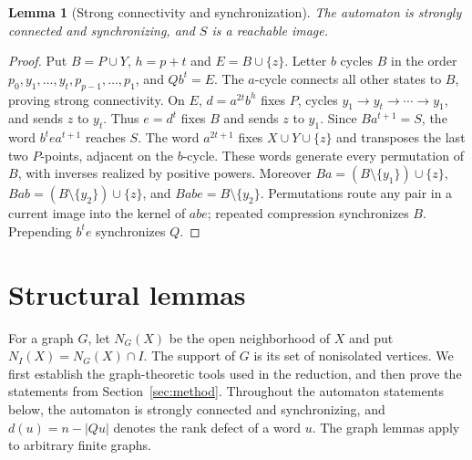 \documentclass[11pt]{article}
\newtheorem{lemma}[theorem]{Lemma}
\theoremstyle{definition}
\theoremstyle{plain}
\begin{document}
\begin{lemma}[Strong connectivity and synchronization]\label{lem:binary-structure}
The automaton is strongly connected and synchronizing, and $S$ is a
reachable image.
\end{lemma}
\begin{proof}
Put $B=P\cup Y$, $h=p+t$ and $E=B\cup\{z\}$.
Letter $b$ cycles $B$ in the order $p_0,y_1,\ldots,y_t,p_{p-1},\ldots,p_1$,
and $Qb^t=E$. The $a$-cycle connects all other states to $B$, proving
strong connectivity.
On $E$, $d=a^{2t}b^h$ fixes $P$, cycles $y_1\to y_t\to\cdots\to y_1$,
and sends $z$ to $y_t$. Thus $e=d^t$ fixes $B$ and sends $z$ to $y_1$.
Since $Ba^{t+1}=S$, the word $b^tea^{t+1}$ reaches $S$.
The word $a^{2t+1}$ fixes $X\cup Y\cup\{z\}$ and transposes the last two
$P$-points, adjacent on the $b$-cycle. These words generate every permutation
of $B$, with inverses realized by positive powers.
Moreover $Ba=(B\setminus\{y_1\})\cup\{z\}$,
$Bab=(B\setminus\{y_2\})\cup\{z\}$, and $Babe=B\setminus\{y_2\}$.
Permutations route any pair in a current image into the kernel of $abe$;
repeated compression synchronizes $B$. Prepending $b^te$ synchronizes $Q$.

\end{proof}




\section{Structural lemmas}\label{sec:reduction-appendix}
For a graph $G$, let $N_G(X)$ be the open neighborhood of $X$ and put $N_I(X)=N_G(X)\cap I$. The support of $G$ is
its set of nonisolated vertices. We first establish the graph-theoretic
tools used in the reduction, and then prove the statements from
Section~\ref{sec:method}.
Throughout the automaton statements below, the automaton is strongly
connected and synchronizing, and $d(u)=n-|Qu|$ denotes the rank defect
of a word $u$. The graph lemmas apply to arbitrary finite graphs.
\end{document}
